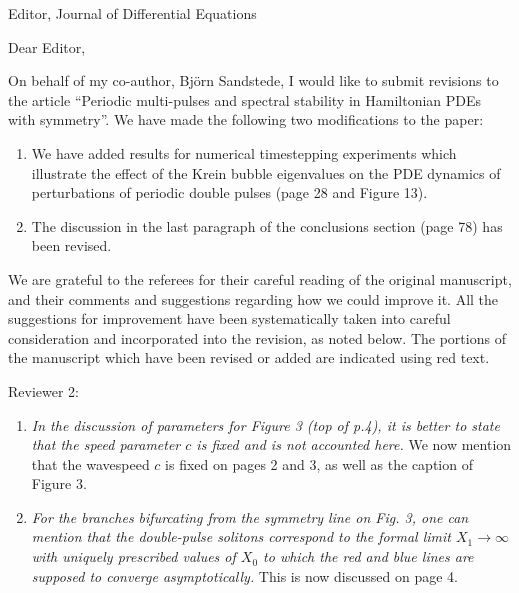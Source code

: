 \documentclass[11pt]{letter}
\begin{document}
\address{Ross Parker \\
Department of Mathematics \\
Southern Methodist University \\
Dallas, TX 75275 \\
\texttt{rhparker@smu.edu}}%
\signature{Ross Parker}
\begin{letter}{Editor, Journal of Differential Equations}

\opening{Dear Editor,}

On behalf of my co-author, Bj\"orn Sandstede, I would like to submit revisions to the article ``Periodic multi-pulses and spectral stability in Hamiltonian PDEs with symmetry''. We have made the following two modifications to the paper:
\begin{enumerate}
    \item We have added results for numerical timestepping experiments which illustrate the effect of the Krein bubble eigenvalues on the PDE dynamics of perturbations of periodic double pulses (page 28 and Figure 13).
    \item The discussion in the last paragraph of the conclusions section (page 78) has been revised.
\end{enumerate}

We are grateful to the referees for their careful reading of the original manuscript, and their comments and suggestions regarding how we could improve it. All the suggestions for improvement have been systematically taken into careful consideration and incorporated into the revision, as noted below. The portions of the manuscript which have been revised or added are indicated using red text.

Reviewer 2:
\begin{enumerate}
    \item \emph{In the discussion of parameters for Figure 3 (top of p.4), it is better to state that the speed parameter $c$ is fixed and is not accounted here.} We now mention that the wavespeed $c$ is fixed on pages 2 and 3, as well as the caption of Figure 3.
    \vspace{4mm}

    \item \emph{For the branches bifurcating from the symmetry line on Fig. 3, one can mention that the double-pulse solitons correspond to the formal limit $X_1 \rightarrow \infty$ with uniquely prescribed values of $X_0$ to which the red and blue lines are supposed to converge asymptotically.} This is now discussed on page 4.
    \vspace{4mm}


\end{enumerate}
\end{letter}
\end{document}
